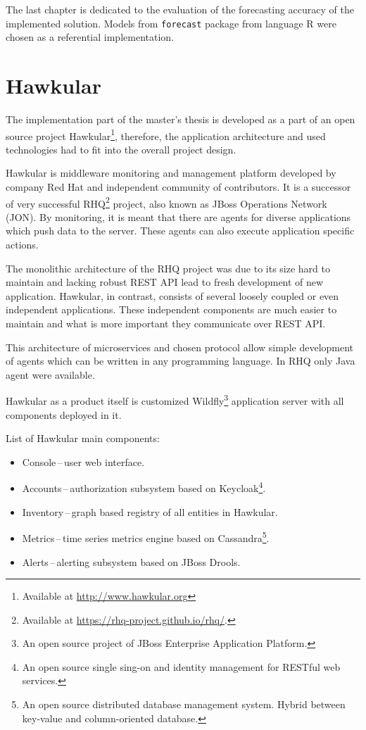 The last chapter is dedicated to the evaluation of the forecasting accuracy of the implemented solution.
Models from \texttt{forecast} package from language R were chosen as a referential implementation.

    \section{Hawkular} \label{sec:hawkular}
    The implementation part of the master's thesis is developed as a part of an open source project
    Hawkular\footnote{Available at \url{http://www.hawkular.org}}, therefore, the application architecture and used
    technologies had to fit into the overall project design.

    Hawkular is middleware monitoring and management platform developed by company Red Hat and independent community
    of contributors. It is a successor of very successful RHQ\footnote{Available at
    \url{https://rhq-project.github.io/rhq/}.} project, also known as JBoss Operations Network (JON). By monitoring,
    it is meant that there are agents for diverse applications which push data to the server. These agents can also
    execute application specific actions.

    The monolithic architecture of the RHQ project was due to its size hard to maintain and lacking robust REST API
    lead to fresh development of new application. Hawkular, in contrast, consists of several loosely coupled or even
    independent applications. These independent components are much easier to maintain and what is more important they
    communicate over REST API.

    This architecture of microservices and chosen protocol allow simple development of agents which can be
    written in any programming language. In RHQ only Java agent were available.

    Hawkular as a product itself is customized
    Wildfly\footnote{An open source project of JBoss Enterprise Application Platform.} application server with all
    components deployed in it.

    List of Hawkular main components:
    \begin{itemize}
        \item Console\,--\,user web interface.
        \item Accounts\,--\,authorization subsystem based on Keycloak\footnote{An open
            source single sing-on and identity management for RESTful web services.}.
        \item Inventory\,--\,graph based registry of all entities in Hawkular.
        \item Metrics\,--\,time series metrics engine based on Cassandra\footnote{An open
            source distributed database management system. Hybrid between key-value and
        column-oriented database.}.
        \item Alerts\,--\,alerting subsystem based on JBoss Drools.
    \end{itemize}

